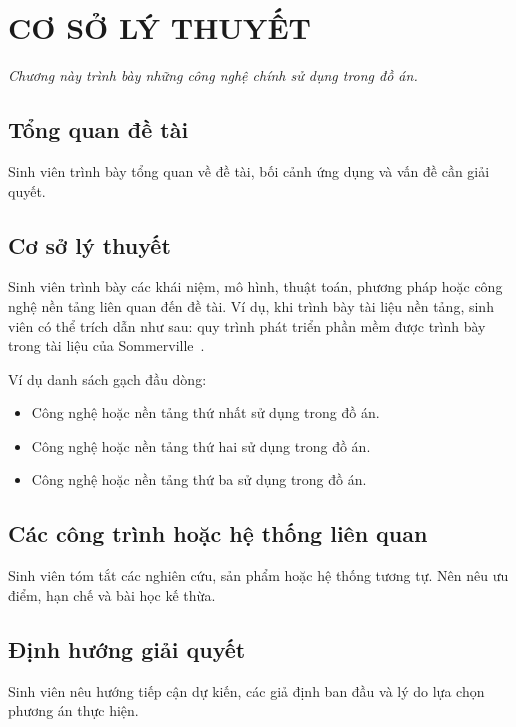 \setcounter{chapter}{0}
\setcounter{section}{0}
\setcounter{table}{0}
\setcounter{figure}{0}
\chapter{CƠ SỞ LÝ THUYẾT}

\textit{Chương này trình bày những công nghệ chính sử dụng trong đồ án.}

\section{Tổng quan đề tài}
Sinh viên trình bày tổng quan về đề tài, bối cảnh ứng dụng và vấn đề cần giải quyết.

\section{Cơ sở lý thuyết}
Sinh viên trình bày các khái niệm, mô hình, thuật toán, phương pháp hoặc công nghệ nền tảng liên quan đến đề tài.
Ví dụ, khi trình bày tài liệu nền tảng, sinh viên có thể trích dẫn như sau: quy trình phát triển phần mềm được trình bày trong tài liệu của Sommerville~\cite{sommerville2016software}.

Ví dụ danh sách gạch đầu dòng:
\begin{itemize}
    \item Công nghệ hoặc nền tảng thứ nhất sử dụng trong đồ án.
    \item Công nghệ hoặc nền tảng thứ hai sử dụng trong đồ án.
    \item Công nghệ hoặc nền tảng thứ ba sử dụng trong đồ án.
\end{itemize}

\section{Các công trình hoặc hệ thống liên quan}
Sinh viên tóm tắt các nghiên cứu, sản phẩm hoặc hệ thống tương tự. Nên nêu ưu điểm, hạn chế và bài học kế thừa.

\section{Định hướng giải quyết}
Sinh viên nêu hướng tiếp cận dự kiến, các giả định ban đầu và lý do lựa chọn phương án thực hiện.


